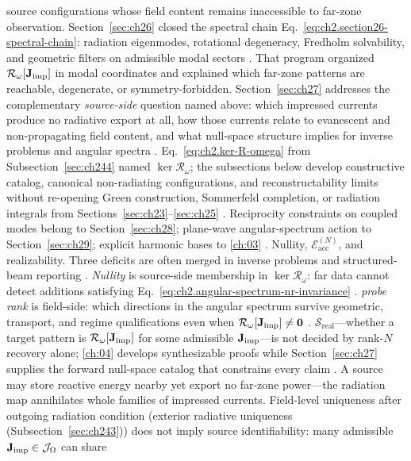 source configurations whose field content remains inaccessible to far-zone observation.
Section~\ref{sec:ch26} closed the spectral chain
Eq.~\eqref{eq:ch2.section26-spectral-chain}: radiation eigenmodes, rotational degeneracy,
Fredholm solvability, and geometric filters on admissible modal sectors
\cite{stratton1941}. That program organized
\(\mathcal{R}_\omega[\mathbf{J}_{\mathrm{imp}}]\) in modal coordinates and explained which far-zone patterns are
reachable, degenerate, or symmetry-forbidden. Section~\ref{sec:ch27} addresses the
complementary \emph{source-side} question named above: which impressed currents produce no radiative
export at all, how those currents relate to evanescent and non-propagating field content,
and what null-space structure implies for inverse problems and angular spectra
\cite{stratton1941}. Eq.~\eqref{eq:ch2.ker-R-omega} from
Subsection~\ref{sec:ch244} named \(\ker\mathcal{R}_\omega\); the subsections below develop
constructive catalog, canonical non-radiating configurations, and reconstructability
limits without re-opening Green construction, Sommerfeld completion, or radiation integrals from
Sections~\ref{sec:ch23}--\ref{sec:ch25} \cite{stratton1941}. Reciprocity constraints on
coupled modes belong to Section~\ref{sec:ch28}; plane-wave angular-spectrum action to
Section~\ref{sec:ch29}; explicit harmonic bases to \ref{ch:03}
\cite{harrington2001}. Nullity, $\mathcal{E}_{\mathrm{acc}}^{(N)}$, and realizability. Three deficits are often merged in inverse problems and structured-beam reporting
\cite{devaney2004}. \emph{Nullity} is source-side membership in
\(\ker\mathcal{R}_\omega\): far data cannot detect additions satisfying
Eq.~\eqref{eq:ch2.angular-spectrum-nr-invariance} \cite{reed1950}.
\emph{probe rank} is field-side: which directions in the angular spectrum survive
geometric, transport, and regime qualifications even when \(\mathcal{R}_\omega[\mathbf{J}_{\mathrm{imp}}]\neq\mathbf{0}\)
\cite{harrington2001}. \emph{$\mathcal{S}_{\mathrm{real}}$}---whether a target pattern is
\(\mathcal{R}_\omega[\mathbf{J}_{\mathrm{imp}}]\) for some admissible \(\mathbf{J}_{\mathrm{imp}}\)---is not decided by rank-$N$ recovery
alone; \ref{ch:04} develops synthesizable proofs while Section~\ref{sec:ch27} supplies the
forward null-space catalog that constrains every claim \cite{colton1992}.
A source may store reactive energy nearby yet export no far-zone power---the radiation map annihilates whole families of impressed currents. Field-level
uniqueness after outgoing radiation condition (exterior radiative uniqueness (Subsection~\ref{sec:ch243})) does
not imply source identifiability: many admissible \(\mathbf{J}_{\mathrm{imp}}\in\mathcal{J}_\Omega\) can share
